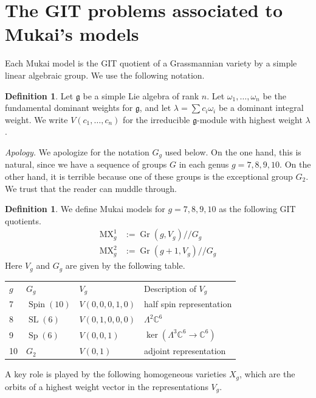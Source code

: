 \documentclass{amsart}[12pt]
\theoremstyle{definition}
\newtheorem{definition}[theorem]{Definition}
\numberwithin{equation}{section}
\newcommand{\SL}{\operatorname{SL}}
\newcommand{\Sp}{\operatorname{Sp}}
\newcommand{\Spin}{\operatorname{Spin}}
\newcommand{\Gr}{\operatorname{Gr}}
\newcommand{\git}{/\!\!/}
\newcommand{\mywedge}{\mathsf{\Lambda}}
\newcommand{\mukai}{\mathrm{MX}}
\newcommand{\LieG}{G}
\begin{document}
\section{The GIT problems associated to Mukai's models } \label{sec: GIT problems}

Each Mukai model is the GIT quotient of a Grassmannian variety by a
simple linear algebraic group. We use the following notation.

\begin{definition} \label{def: Vc notation}
  Let $\mathfrak{g}$ be a simple Lie algebra of rank $n$. Let
  $\omega_1,\ldots,\omega_n$ be the fundamental dominant weights for
  $\mathfrak{g}$, and let $\lambda = \sum c_i \omega_i$ be a dominant
  integral weight. We write $V(c_1,\ldots,c_n)$ for the irreducible
  $\mathfrak{g}$-module with highest weight $\lambda$. 
\end{definition}


\textit{Apology.} We
apologize for the notation $\LieG_g$ used below. On the one hand, this is natural,
since we have a sequence of groups $G$ in each genus $g=7,8,9,10$. On the
other hand, it is terrible because one of these groups is the
exceptional group $G_2$. We trust that the reader can muddle through. 

\begin{definition}
  We define Mukai models for $g=7,8,9,10$ as the following GIT quotients.
\begin{align*}
  \mukai^{1}_g &:= \Gr(g,V_g) \git \LieG_g \\
  \mukai^{2}_g &:= \Gr(g+1,V_g) \git \LieG_g
\end{align*}
Here $V_g$ and $\LieG_g$ are given by the following table.
\begin{center}
\begin{tabular}{llll}
  $g$  & $\LieG_g$ & $V_g$ & Description of $V_g$ \\
  7 & $\Spin(10)$ & $V(0,0,0,1,0)$ & half spin representation \\
  8 & $\SL(6)$ & $V(0,1,0,0,0)$ & $\mywedge^2 \mathbb{C}^6$ \\
  9 & $\Sp(6)$ & $V(0,0,1)$ & $\ker(\mywedge^3 \mathbb{C}^6 \rightarrow \mathbb{C}^6 )$\\
  10 & $G_2$ & $V(0,1)$ & adjoint representation
\end{tabular}
\end{center}
\end{definition}

A key role is played by the following homogeneous varieties $X_g$,
which are the orbits of a highest weight vector in the representations $V_g$. 
\end{document}
